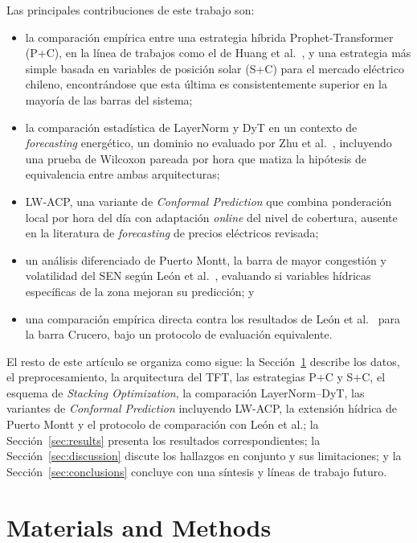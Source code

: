 \documentclass[applsci,article,submit,moreauthors,pdftex]{Definitions/mdpi}
\begin{document}
Las principales contribuciones de este trabajo son:
\begin{itemize}[leftmargin=*,labelsep=5.8mm]
\item la comparación empírica entre una estrategia híbrida Prophet-Transformer (P+C), en la línea de trabajos como el de Huang et al.\ \cite{ProphetTransformers}, y una estrategia más simple basada en variables de posición solar (S+C) para el mercado eléctrico chileno, encontrándose que esta última es consistentemente superior en la mayoría de las barras del sistema;
\item la comparación estadística de LayerNorm y DyT en un contexto de \textit{forecasting} energético, un dominio no evaluado por Zhu et al.\ \cite{Zhu2025Transformers}, incluyendo una prueba de Wilcoxon pareada por hora que matiza la hipótesis de equivalencia entre ambas arquitecturas;
\item LW-ACP, una variante de \textit{Conformal Prediction} que combina ponderación local por hora del día con adaptación \textit{online} del nivel de cobertura, ausente en la literatura de \textit{forecasting} de precios eléctricos revisada;
\item un análisis diferenciado de Puerto Montt, la barra de mayor congestión y volatilidad del SEN según León et al.\ \cite{LeonSMPChile}, evaluando si variables hídricas específicas de la zona mejoran su predicción; y
\item una comparación empírica directa contra los resultados de León et al.\ \cite{LeonSMPChile} para la barra Crucero, bajo un protocolo de evaluación equivalente.
\end{itemize}

El resto de este artículo se organiza como sigue: la Sección~\ref{sec:materials} describe los datos, el preprocesamiento, la arquitectura del TFT, las estrategias P+C y S+C, el esquema de \textit{Stacking Optimization}, la comparación LayerNorm--DyT, las variantes de \textit{Conformal Prediction} incluyendo LW-ACP, la extensión hídrica de Puerto Montt y el protocolo de comparación con León et al.; la Sección~\ref{sec:results} presenta los resultados correspondientes; la Sección~\ref{sec:discussion} discute los hallazgos en conjunto y sus limitaciones; y la Sección~\ref{sec:conclusions} concluye con una síntesis y líneas de trabajo futuro.

\section{Materials and Methods}
\label{sec:materials}
\end{document}
